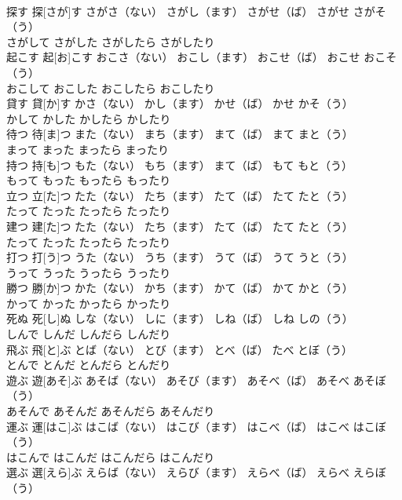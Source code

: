 \documentclass[8pt]{extreport}
\begin{document}
\begin{CJK}{UTF8}{min}
\\	探す	探[さが]す	さがさ（ない）	さがし（ます）	さがせ（ば）	さがせ	さがそ（う）	
\\	さがして	さがした	さがしたら	さがしたり
\\	起こす	起[お]こす	おこさ（ない）	おこし（ます）	おこせ（ば）	おこせ	おこそ（う）	
\\	おこして	おこした	おこしたら	おこしたり
\\	貸す	貸[か]す	かさ（ない）	かし（ます）	かせ（ば）	かせ	かそ（う）	
\\	かして	かした	かしたら	かしたり
\\	待つ	待[ま]つ	また（ない）	まち（ます）	まて（ば）	まて	まと（う）	
\\	まって	まった	まったら	まったり
\\	持つ	持[も]つ	もた（ない）	もち（ます）	まて（ば）	もて	もと（う）	
\\	もって	もった	もったら	もったり
\\	立つ	立[た]つ	たた（ない）	たち（ます）	たて（ば）	たて	たと（う）	
\\	たって	たった	たったら	たったり
\\	建つ	建[た]つ	たた（ない）	たち（ます）	たて（ば）	たて	たと（う）	
\\	たって	たった	たったら	たったり
\\	打つ	打[う]つ	うた（ない）	うち（ます）	うて（ば）	うて	うと（う）	
\\	うって	うった	うったら	うったり
\\	勝つ	勝[か]つ	かた（ない）	かち（ます）	かて（ば）	かて	かと（う）	
\\	かって	かった	かったら	かったり
\\	死ぬ	死[し]ぬ	しな（ない）	しに（ます）	しね（ば）	しね	しの（う）	
\\	しんで	しんだ	しんだら	しんだり
\\	飛ぶ	飛[と]ぶ	とば（ない）	とび（ます）	とべ（ば）	たべ	とぼ（う）	
\\	とんで	とんだ	とんだら	とんだり
\\	遊ぶ	遊[あそ]ぶ	あそば（ない）	あそび（ます）	あそべ（ば）	あそべ	あそぼ（う）	
\\	あそんで	あそんだ	あそんだら	あそんだり
\\	運ぶ	運[はこ]ぶ	はこば（ない）	はこび（ます）	はこべ（ば）	はこべ	はこぼ（う）	
\\	はこんで	はこんだ	はこんだら	はこんだり
\\	選ぶ	選[えら]ぶ	えらば（ない）	えらび（ます）	えらべ（ば）	えらべ	えらぼ（う）	

\end{CJK}
\end{document}
